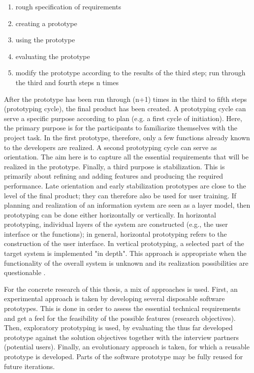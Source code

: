 \begin{enumerate}
	\item rough specification of requirements
	\item creating a prototype
	\item using the prototype
	\item evaluating the prototype
	\item modify the prototype according to the results of the third step; run through the third and fourth steps n times
\end{enumerate}

After the prototype has been run through (n+1) times in the third to fifth steps (prototyping cycle), the final product has been created. A prototyping cycle can serve a specific purpose according to plan (e.g. a first cycle of initiation). Here, the primary purpose is for the participants to familiarize themselves with the project task. In the first prototype, therefore, only a few functions already known to the developers are realized. A second prototyping cycle can serve as orientation. The aim here is to capture all the essential requirements that will be realized in the prototype. Finally, a third purpose is stabilization. This is primarily about refining and adding features and producing the required performance. Late orientation and early stabilization prototypes are close to the level of the final product; they can therefore also be used for user training. If planning and realization of an information system are seen as a layer model, then prototyping can be done either horizontally or vertically. In horizontal prototyping, individual layers of the system are constructed (e.g., the user interface or the functions); in general, horizontal prototyping refers to the construction of the user interface. In vertical prototyping, a selected part of the target system is implemented "in depth". This approach is appropriate when the functionality of the overall system is unknown and its realization possibilities are questionable
\autocite{riedlManagementInformatik2019}.

For the concrete research of this thesis,
a mix of approaches is used.
First,
an experimental approach is taken
by developing several disposable software prototypes.
This is done in order to assess the essential technical requirements
and get a feel for the feasibility of the possible features (research objectives).
Then,
exploratory prototyping is used,
by evaluating the thus far developed prototype against the solution objectives
together with the interview partners (potential users).
Finally,
an evolutionary approach is taken,
for which a reusable prototype is developed.
Parts of the software prototype may be fully reused for future iterations.

